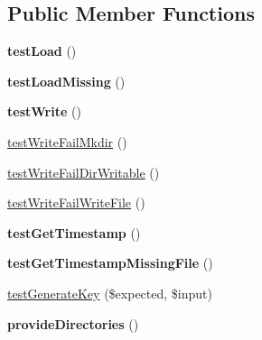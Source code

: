 \subsection*{Public Member Functions}
\begin{DoxyCompactItemize}
\item 
{\bfseries test\+Load} ()\hypertarget{classTwig__Tests__Cache__FilesystemTest_a2b811992bc7720639b960ab5354b20f3}{}\label{classTwig__Tests__Cache__FilesystemTest_a2b811992bc7720639b960ab5354b20f3}

\item 
{\bfseries test\+Load\+Missing} ()\hypertarget{classTwig__Tests__Cache__FilesystemTest_ad5f92323a66921bca03a864fc3c697bd}{}\label{classTwig__Tests__Cache__FilesystemTest_ad5f92323a66921bca03a864fc3c697bd}

\item 
{\bfseries test\+Write} ()\hypertarget{classTwig__Tests__Cache__FilesystemTest_a18083b6b535917dd60cb2acb4a6b0e3d}{}\label{classTwig__Tests__Cache__FilesystemTest_a18083b6b535917dd60cb2acb4a6b0e3d}

\item 
\hyperlink{classTwig__Tests__Cache__FilesystemTest_ab58cfc703ff9de416d32d4856649b99b}{test\+Write\+Fail\+Mkdir} ()
\item 
\hyperlink{classTwig__Tests__Cache__FilesystemTest_ab441a4fbe54095c67b6e511591d05b6f}{test\+Write\+Fail\+Dir\+Writable} ()
\item 
\hyperlink{classTwig__Tests__Cache__FilesystemTest_a5ce77e0f9198d59e941915ad8450a3bb}{test\+Write\+Fail\+Write\+File} ()
\item 
{\bfseries test\+Get\+Timestamp} ()\hypertarget{classTwig__Tests__Cache__FilesystemTest_a53afef76012034bd4686753e8407f3cc}{}\label{classTwig__Tests__Cache__FilesystemTest_a53afef76012034bd4686753e8407f3cc}

\item 
{\bfseries test\+Get\+Timestamp\+Missing\+File} ()\hypertarget{classTwig__Tests__Cache__FilesystemTest_a49db4997b964836762203c96acc6dd4a}{}\label{classTwig__Tests__Cache__FilesystemTest_a49db4997b964836762203c96acc6dd4a}

\item 
\hyperlink{classTwig__Tests__Cache__FilesystemTest_a69182a09ff4a59db8a80051dfd66d3be}{test\+Generate\+Key} (\$expected, \$input)
\item 
{\bfseries provide\+Directories} ()\hypertarget{classTwig__Tests__Cache__FilesystemTest_a5eaa40bd226d96667008c2e4b531ff6e}{}\label{classTwig__Tests__Cache__FilesystemTest_a5eaa40bd226d96667008c2e4b531ff6e}

\end{DoxyCompactItemize}
